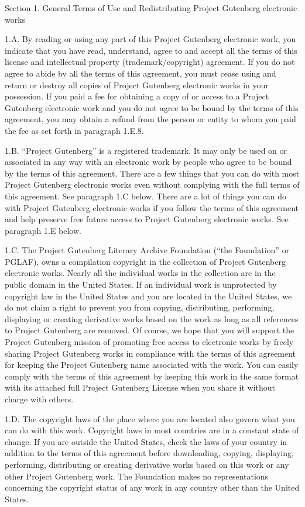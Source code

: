 \documentclass[11pt,openany,oneside]{book}
\begin{document}
Section 1. General Terms of Use and Redistributing Project Gutenberg electronic works 

1.A. By reading or using any part of this Project Gutenberg electronic work, you indicate that you have read, understand, agree to and accept all the terms of this license and intellectual property (trademark/copyright) agreement. If you do not agree to abide by all the terms of this agreement, you must cease using and return or destroy all copies of Project Gutenberg electronic works in your possession. If you paid a fee for obtaining a copy of or access to a Project Gutenberg electronic work and you do not agree to be bound by the terms of this agreement, you may obtain a refund from the person or entity to whom you paid the fee as set forth in paragraph 1.E.8. 

1.B. “Project Gutenberg” is a registered trademark. It may only be used on or associated in any way with an electronic work by people who agree to be bound by the terms of this agreement. There are a few things that you can do with most Project Gutenberg electronic works even without complying with the full terms of this agreement. See paragraph 1.C below. There are a lot of things you can do with Project Gutenberg electronic works if you follow the terms of this agreement and help preserve free future access to Project Gutenberg electronic works. See paragraph 1.E below. 

1.C. The Project Gutenberg Literary Archive Foundation (“the Foundation” or PGLAF), owns a compilation copyright in the collection of Project Gutenberg electronic works. Nearly all the individual works in the collection are in the public domain in the United States. If an individual work is unprotected by copyright law in the United States and you are located in the United States, we do not claim a right to prevent you from copying, distributing, performing, displaying or creating derivative works based on the work as long as all references to Project Gutenberg are removed. Of course, we hope that you will support the Project Gutenberg mission of promoting free access to electronic works by freely sharing Project Gutenberg works in compliance with the terms of this agreement for keeping the Project Gutenberg name associated with the work. You can easily comply with the terms of this agreement by keeping this work in the same format with its attached full Project Gutenberg License when you share it without charge with others. 

1.D. The copyright laws of the place where you are located also govern what you can do with this work. Copyright laws in most countries are in a constant state of change. If you are outside the United States, check the laws of your country in addition to the terms of this agreement before downloading, copying, displaying, performing, distributing or creating derivative works based on this work or any other Project Gutenberg work. The Foundation makes no representations concerning the copyright status of any work in any country other than the United States. 
\end{document}
